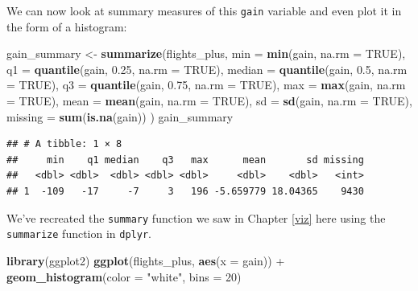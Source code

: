 \documentclass[]{tufte-book}
\newenvironment{Shaded}{\begin{snugshade}}{\end{snugshade}}
\newcommand{\KeywordTok}[1]{\textcolor[rgb]{0.13,0.29,0.53}{\textbf{{#1}}}}
\newcommand{\DataTypeTok}[1]{\textcolor[rgb]{0.13,0.29,0.53}{{#1}}}
\newcommand{\DecValTok}[1]{\textcolor[rgb]{0.00,0.00,0.81}{{#1}}}
\newcommand{\FloatTok}[1]{\textcolor[rgb]{0.00,0.00,0.81}{{#1}}}
\newcommand{\StringTok}[1]{\textcolor[rgb]{0.31,0.60,0.02}{{#1}}}
\newcommand{\OtherTok}[1]{\textcolor[rgb]{0.56,0.35,0.01}{{#1}}}
\newcommand{\NormalTok}[1]{{#1}}
\begin{document}
We can now look at summary measures of this \texttt{gain} variable and
even plot it in the form of a histogram:

\begin{Shaded}
\begin{Highlighting}[]
\NormalTok{gain_summary <-}\StringTok{ }\KeywordTok{summarize}\NormalTok{(flights_plus,}
          \DataTypeTok{min =} \KeywordTok{min}\NormalTok{(gain, }\DataTypeTok{na.rm =} \OtherTok{TRUE}\NormalTok{),}
          \DataTypeTok{q1 =} \KeywordTok{quantile}\NormalTok{(gain, }\FloatTok{0.25}\NormalTok{, }\DataTypeTok{na.rm =} \OtherTok{TRUE}\NormalTok{),}
          \DataTypeTok{median =} \KeywordTok{quantile}\NormalTok{(gain, }\FloatTok{0.5}\NormalTok{, }\DataTypeTok{na.rm =} \OtherTok{TRUE}\NormalTok{),}
          \DataTypeTok{q3 =} \KeywordTok{quantile}\NormalTok{(gain, }\FloatTok{0.75}\NormalTok{, }\DataTypeTok{na.rm =} \OtherTok{TRUE}\NormalTok{),}
          \DataTypeTok{max =} \KeywordTok{max}\NormalTok{(gain, }\DataTypeTok{na.rm =} \OtherTok{TRUE}\NormalTok{),}
          \DataTypeTok{mean =} \KeywordTok{mean}\NormalTok{(gain, }\DataTypeTok{na.rm =} \OtherTok{TRUE}\NormalTok{),}
          \DataTypeTok{sd =} \KeywordTok{sd}\NormalTok{(gain, }\DataTypeTok{na.rm =} \OtherTok{TRUE}\NormalTok{),}
          \DataTypeTok{missing =} \KeywordTok{sum}\NormalTok{(}\KeywordTok{is.na}\NormalTok{(gain))}
\NormalTok{)}
\NormalTok{gain_summary}
\end{Highlighting}
\end{Shaded}

\begin{verbatim}
## # A tibble: 1 × 8
##     min    q1 median    q3   max      mean       sd missing
##   <dbl> <dbl>  <dbl> <dbl> <dbl>     <dbl>    <dbl>   <int>
## 1  -109   -17     -7     3   196 -5.659779 18.04365    9430
\end{verbatim}

We've recreated the \texttt{summary} function we saw in Chapter
\ref{viz} here using the \texttt{summarize} function in \texttt{dplyr}.

\begin{Shaded}
\begin{Highlighting}[]
\KeywordTok{library}\NormalTok{(ggplot2)}
\KeywordTok{ggplot}\NormalTok{(flights_plus, }\KeywordTok{aes}\NormalTok{(}\DataTypeTok{x =} \NormalTok{gain)) +}
\StringTok{  }\KeywordTok{geom_histogram}\NormalTok{(}\DataTypeTok{color =} \StringTok{"white"}\NormalTok{, }\DataTypeTok{bins =} \DecValTok{20}\NormalTok{)}
\end{Highlighting}
\end{Shaded}
\end{document}
